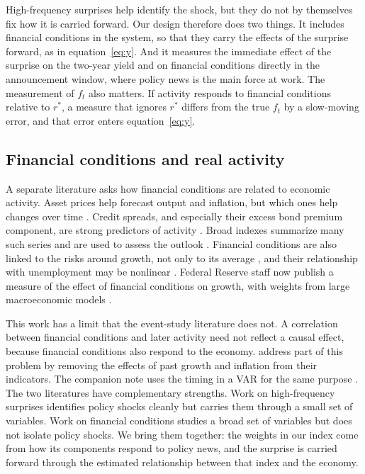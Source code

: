 \documentclass[11pt]{article}
\newcommand{\rs}{r^{*}}
\begin{document}
High-frequency surprises help identify the shock, but they do not by themselves fix how it is carried forward. Our design therefore does two things. It includes financial conditions in the system, so that they carry the effects of the surprise forward, as in equation~\eqref{eq:y}. And it measures the immediate effect of the surprise on the two-year yield and on financial conditions directly in the announcement window, where policy news is the main force at work. The measurement of $f_t$ also matters. If activity responds to financial conditions relative to $\rs$, a measure that ignores $\rs$ differs from the true $f_t$ by a slow-moving error, and that error enters equation~\eqref{eq:y}.

\subsection{Financial conditions and real activity}
A separate literature asks how financial conditions are related to economic activity. Asset prices help forecast output and inflation, but which ones help changes over time \citep{stock2003}. Credit spreads, and especially their excess bond premium component, are strong predictors of activity \citep{gilchrist2012}. Broad indexes summarize many such series and are used to assess the outlook \citep{hatzius2010,brave2011}. Financial conditions are also linked to the risks around growth, not only to its average \citep{adrian2019}, and their relationship with unemployment may be nonlinear \citep{kiley2020ml}. Federal Reserve staff now publish a measure of the effect of financial conditions on growth, with weights from large macroeconomic models \citep{ajello2023}.

This work has a limit that the event-study literature does not. A correlation between financial conditions and later activity need not reflect a causal effect, because financial conditions also respond to the economy. \citet{hatzius2010} address part of this problem by removing the effects of past growth and inflation from their indicators. The companion note uses the timing in a VAR for the same purpose \citep{fcinote}. The two literatures have complementary strengths. Work on high-frequency surprises identifies policy shocks cleanly but carries them through a small set of variables. Work on financial conditions studies a broad set of variables but does not isolate policy shocks. We bring them together: the weights in our index come from how its components respond to policy news, and the surprise is carried forward through the estimated relationship between that index and the economy.
\end{document}
